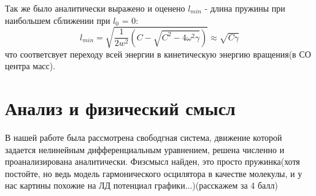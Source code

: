 \documentclass[a4paper, 12pt]{article}
\begin{document}
    Так же было аналитически выражено и оценено $l_{min}$ - длина пружины при наибольшем сближении при $l_0$ = 0:
    \[l_{min} = \sqrt{\frac{1}{2w^2}(C - \sqrt{C^2 - 4\omega^2 \gamma})} \approx \sqrt{C\gamma}\]
    что соответсвует переходу всей энергии в кинетическую энергию вращения(в СО центра масс).

    
    \newpage
    
 \section{Анализ и физический смысл}
 В нашей работе была рассмотрена свободгная система, движение которой задается нелинейным дифференциальным уравнением, решена численно и проанализирована аналитически. Физсмысл найден, это просто пружинка(хотя постойте, но ведь модель гармонического осцилятора в качестве молекулы, и у нас картины похожие на ЛД потенциал графики...)(расскажем за 4 балл)
\end{document}
